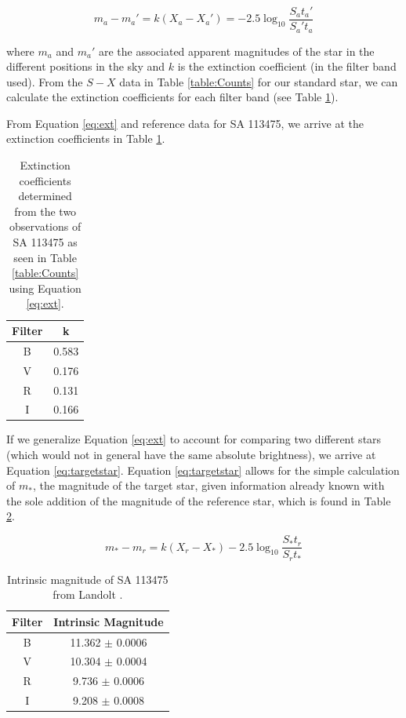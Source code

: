 \documentclass{article}
\begin{document}
\begin{equation}
\label{eq:ext}
m_a-m_a'=k(X_a-X_a')=-2.5\log_{10}\frac{S_at_a'}{S_a't_a}
\end{equation}

where $m_a$ and $m_a'$ are the associated apparent magnitudes of the star in the different positions in the sky and $k$ is the
extinction coefficient (in the filter band used). From the $S-X$ data in Table \ref{table:Counts} for our standard star, we can
calculate the extinction coefficients for each filter band (see Table \ref{table:coeff}).

From Equation \ref{eq:ext} and reference data for SA 113475, we arrive at the extinction coefficients in Table \ref{table:coeff}.

\begin{table}
\begin{center}
\begin{tabular}{c | c}
Filter & k \\
\hline
B& 0.583\\
V&0.176\\
R& 0.131\\
I&0.166
\end{tabular}
\end{center}
\caption{Extinction coefficients determined from the two observations of SA 113475 as seen in Table \ref{table:Counts} using Equation \ref{eq:ext}.}
\label{table:coeff}
\end{table}

If we generalize Equation \ref{eq:ext} to account for comparing two different stars (which would not in general have the same absolute brightness),
we arrive at Equation \ref{eq:targetstar}. Equation \ref{eq:targetstar} allows for the simple calculation of $m_*$, the magnitude
of the target star, given information already known with the sole addition of the magnitude of the reference star, which is found in Table
\ref{table:SAmag}.

\begin{equation}
\label{eq:targetstar}
m_*-m_r=k(X_r-X_*)-2.5\log_{10}\frac{S_*t_r}{S_rt_*}
\end{equation}

\begin{table}
\begin{center}
\begin{tabular}{c | c}
Filter & Intrinsic Magnitude \\
\hline
B & 11.362 $\pm$ 0.0006\\
V &  10.304 $\pm$ 0.0004\\
R & 9.736 $\pm$ 0.0006\\
I & 9.208 $\pm$ 0.0008
\end{tabular}
\end{center}
\caption{Intrinsic magnitude of SA 113475 from Landolt \cite{landolt}.}
\label{table:SAmag}
\end{table}
\end{document}
